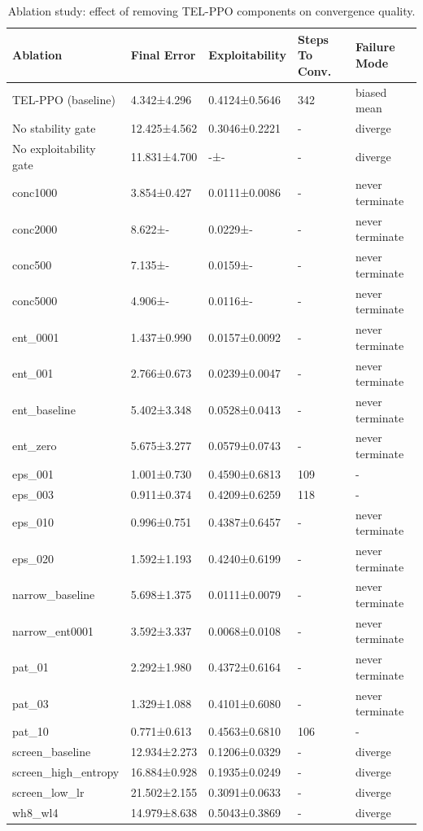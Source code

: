 \begin{table}[htbp]
\centering
\caption{Ablation study: effect of removing TEL-PPO components on convergence quality.}
\label{tab:ablation_results}
\begin{tabular}{lllll}
\toprule
Ablation & Final Error & Exploitability & Steps To Conv. & Failure Mode \\
\midrule
TEL-PPO (baseline) & 4.342±4.296 & 0.4124±0.5646 & 342 & biased mean \\
No stability gate & 12.425±4.562 & 0.3046±0.2221 & - & diverge \\
No exploitability gate & 11.831±4.700 & -±- & - & diverge \\
conc1000 & 3.854±0.427 & 0.0111±0.0086 & - & never terminate \\
conc2000 & 8.622±- & 0.0229±- & - & never terminate \\
conc500 & 7.135±- & 0.0159±- & - & never terminate \\
conc5000 & 4.906±- & 0.0116±- & - & never terminate \\
ent_0001 & 1.437±0.990 & 0.0157±0.0092 & - & never terminate \\
ent_001 & 2.766±0.673 & 0.0239±0.0047 & - & never terminate \\
ent_baseline & 5.402±3.348 & 0.0528±0.0413 & - & never terminate \\
ent_zero & 5.675±3.277 & 0.0579±0.0743 & - & never terminate \\
eps_001 & 1.001±0.730 & 0.4590±0.6813 & 109 & - \\
eps_003 & 0.911±0.374 & 0.4209±0.6259 & 118 & - \\
eps_010 & 0.996±0.751 & 0.4387±0.6457 & - & never terminate \\
eps_020 & 1.592±1.193 & 0.4240±0.6199 & - & never terminate \\
narrow_baseline & 5.698±1.375 & 0.0111±0.0079 & - & never terminate \\
narrow_ent0001 & 3.592±3.337 & 0.0068±0.0108 & - & never terminate \\
pat_01 & 2.292±1.980 & 0.4372±0.6164 & - & never terminate \\
pat_03 & 1.329±1.088 & 0.4101±0.6080 & - & never terminate \\
pat_10 & 0.771±0.613 & 0.4563±0.6810 & 106 & - \\
screen_baseline & 12.934±2.273 & 0.1206±0.0329 & - & diverge \\
screen_high_entropy & 16.884±0.928 & 0.1935±0.0249 & - & diverge \\
screen_low_lr & 21.502±2.155 & 0.3091±0.0633 & - & diverge \\
wh8_wl4 & 14.979±8.638 & 0.5043±0.3869 & - & diverge \\
\bottomrule
\end{tabular}

\end{table}
